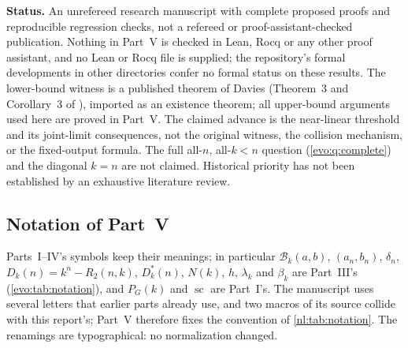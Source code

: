 \documentclass[11pt,a4paper]{article}
\numberwithin{equation}{section}
\theoremstyle{definition}
\theoremstyle{remark}
\newcommand{\statecomplex}{\operatorname{sc}}
\newcommand{\Bip}{\mathcal B}
\begin{document}
\begin{resultbox}
\textbf{Status.} An unrefereed research manuscript with complete proposed
proofs and reproducible regression checks, not a refereed or
proof-assistant-checked publication. Nothing in Part~V is checked in Lean,
Rocq or any other proof assistant, and no Lean or Rocq file is supplied; the
repository's formal developments in other directories confer no formal
status on these results. The lower-bound witness is a published theorem of
Davies (Theorem~3 and Corollary~3 of \cite{Davies2017}), imported as an
existence theorem; all upper-bound arguments used here are proved in Part~V.
The claimed advance is the near-linear threshold and its joint-limit
consequences, not the original witness, the collision mechanism, or the
fixed-output formula. The full all-$n$, all-$k<n$ question
(\cref{evo:q:complete}) and the diagonal $k=n$ are not claimed. Historical
priority has not been established by an exhaustive literature review.
\end{resultbox}

\subsection{Notation of Part~V}\label{nl:sec:notation}

Parts~I--IV's symbols keep their meanings; in particular $\Bip_k(a,b)$,
$(a_n,b_n)$, $\delta_n$, $D_k(n)=k^n-R_2(n,k)$, $D^*_k(n)$, $N(k)$, $h$,
$\lambda_k$ and $\beta_k$ are Part~III's (\cref{evo:tab:notation}), and
$P_G(k)$ and $\statecomplex$ are Part~I's. The manuscript uses several
letters that earlier parts already use, and two macros of its source
collide with this report's; Part~V therefore fixes the convention of
\cref{nl:tab:notation}. The renamings are typographical: no normalization
changed.
\end{document}
